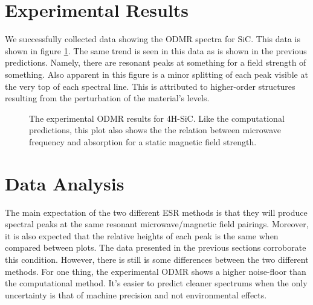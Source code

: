 \documentclass[oneside, astronomy, noacknowlegments]{BYUPhys}
\begin{document}
\section{Experimental Results}

We successfully collected data showing the ODMR spectra for SiC. This data is shown in figure \ref{fig:SiCResults}. The same trend is seen in this data as is shown in the previous predictions. Namely, there are resonant peaks at something for a field strength of something. Also apparent in this figure is a minor splitting of each peak visible at the very top of each spectral line. This is attributed to higher-order structures resulting from the perturbation of the material's levels.

\begin{figure}
    \caption[Experimental ODMR for SiC]{\label{fig:SiCResults}
     The experimental ODMR results for 4H-SiC. Like the computational predictions, this plot also shows the the relation between microwave frequency and absorption for a static magnetic field strength.}
 \end{figure}

\section{Data Analysis}

The main expectation of the two different ESR methods is that they will produce spectral peaks at the same resonant microwave/magnetic field pairings. Moreover, it is also expected that the relative heights of each peak is the same when compared between plots. The data presented in the previous sections corroborate this condition. However, there is still is some differences between the two different methods. For one thing, the experimental ODMR shows a higher noise-floor than the computational method. It's easier to predict cleaner spectrums when the only uncertainty is that of machine precision and not environmental effects.
\end{document}
